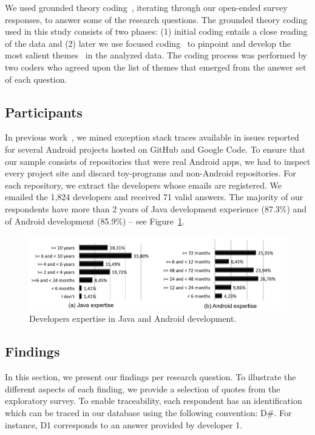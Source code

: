 We used grounded theory coding~\cite{charmaz2006}, iterating through our open-ended survey responses, to answer some of the research questions. The grounded theory coding used in this study consists of two phases: (1) initial coding entails a close reading of the data and (2) later we use focused coding~\cite{charmaz2006} to pinpoint and develop the most salient themes~\cite{charmaz2006} in the analyzed data. The coding process was performed by two coders who agreed upon the list of themes that emerged from the answer set of each question.

\subsection{Participants}

 In previous work~\cite{coelhoetal15}, we mined exception stack traces available in issues reported for several Android projects hosted on GitHub and Google Code. To ensure that our sample consists of repositories that were real Android apps, we had to inspect every project site and discard toy-programs and non-Android repositories. For each repository, we extract the developers whose emails are registered. We emailed the 1,824 developers and received 71 valid answers. The majority of our respondents have more than 2 years of Java development experience (87.3\%) and of Android development (85.9\%) -- see Figure~\ref{fig:devexpertise}.

\begin{figure} \centering \includegraphics[scale=0.38]{expertise_new.png}
\caption{Developers expertise in Java and Android development.}
\label{fig:devexpertise}
\end{figure}

\subsection{Findings}

In this section, we present our findings per research question. 
To illustrate the different aspects of each
finding, we provide a selection of quotes from the exploratory
survey. 
To enable traceability, each respondent has an identification
 which can be traced in our database using the following convention: 
D\#. For instance, D1 corresponds to an answer provided
 by developer 1.


